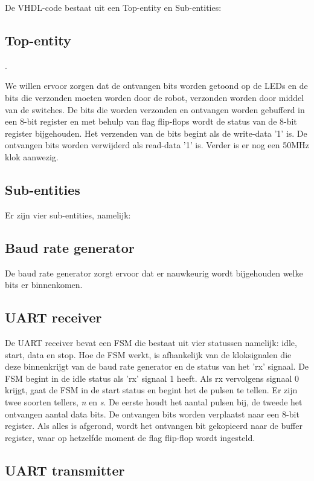 \documentclass{report}
\begin{document}
De VHDL-code bestaat uit een Top-entity en Sub-entities:


\subsection{Top-entity}.

We willen ervoor zorgen dat de ontvangen bits worden getoond op de LEDs en de bits die verzonden moeten worden door de robot, verzonden worden door middel van de switches.
De bits die worden verzonden en ontvangen worden gebufferd in een 8-bit register en met behulp van flag flip-flops wordt de status van de 8-bit register bijgehouden.
Het verzenden van de bits begint als de write-data '1' is.
De ontvangen bits worden verwijderd als read-data '1' is.
Verder is er nog een 50MHz klok aanwezig.

\subsection{Sub-entities}

Er zijn vier sub-entities, namelijk:

\subsection*{Baud rate generator}

De baud rate generator zorgt ervoor dat er nauwkeurig wordt bijgehouden welke bits er binnenkomen.

\subsection*{UART receiver}

De UART receiver bevat een FSM die bestaat uit vier statussen namelijk: idle, start, data en stop.
Hoe de FSM werkt, is afhankelijk van de kloksignalen die deze binnenkrijgt van de baud rate generator en de status van het 'rx' signaal.
De FSM begint in de idle status als 'rx' signaal 1 heeft.
Als rx vervolgens signaal 0 krijgt, gaat de FSM in de start status en begint het de pulsen te tellen.
Er zijn twee soorten tellers, \textit{n} en \textit{s}.
De eerste houdt het aantal pulsen bij, de tweede het ontvangen aantal data bits.
De ontvangen bits worden verplaatst naar een 8-bit register.
Als alles is afgerond, wordt het ontvangen bit gekopieerd naar de buffer register, waar op hetzelfde moment de flag flip-flop wordt ingesteld.
 
\subsection*{UART transmitter}
\end{document}
